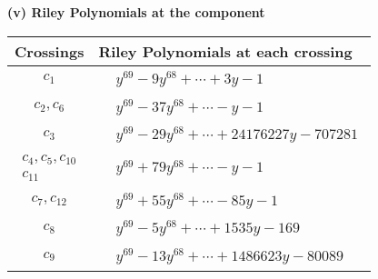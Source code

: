\documentclass[1p]{elsarticle_modified}
\theoremstyle{definition}
\begin{document}
\newpage\renewcommand{\arraystretch}{1}
\flushleft \textbf{(v) Riley Polynomials at the component}\newline \\
\begin{tabular}{m{50pt}|m{274pt}}
Crossings & \hspace{64pt}Riley Polynomials at each crossing \\
\hline $$\begin{aligned}c_{1}\end{aligned}$$&$\begin{aligned}
&y^{69}-9 y^{68}+\cdots+3 y-1
\end{aligned}$\\
\hline $$\begin{aligned}c_{2},c_{6}\end{aligned}$$&$\begin{aligned}
&y^{69}-37 y^{68}+\cdots- y-1
\end{aligned}$\\
\hline $$\begin{aligned}c_{3}\end{aligned}$$&$\begin{aligned}
&y^{69}-29 y^{68}+\cdots+24176227 y-707281
\end{aligned}$\\
\hline $$\begin{aligned}c_{4},c_{5},c_{10}\\c_{11}\end{aligned}$$&$\begin{aligned}
&y^{69}+79 y^{68}+\cdots- y-1
\end{aligned}$\\
\hline $$\begin{aligned}c_{7},c_{12}\end{aligned}$$&$\begin{aligned}
&y^{69}+55 y^{68}+\cdots-85 y-1
\end{aligned}$\\
\hline $$\begin{aligned}c_{8}\end{aligned}$$&$\begin{aligned}
&y^{69}-5 y^{68}+\cdots+1535 y-169
\end{aligned}$\\
\hline $$\begin{aligned}c_{9}\end{aligned}$$&$\begin{aligned}
&y^{69}-13 y^{68}+\cdots+1486623 y-80089
\end{aligned}$\\
\hline
\end{tabular}\\~\\
\end{document}
